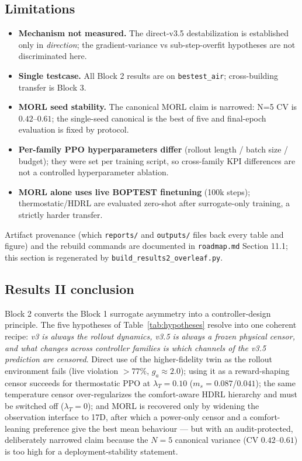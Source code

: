 \documentclass[11pt,a4paper]{article}
\begin{document}
\subsection{Limitations}

\begin{itemize}
  \item \textbf{Mechanism not measured.} The direct-v3.5 destabilization is established only in \emph{direction}; the gradient-variance vs sub-step-overfit hypotheses are not discriminated here.
  \item \textbf{Single testcase.} All Block 2 results are on \texttt{bestest\_air}; cross-building transfer is Block 3.
  \item \textbf{MORL seed stability.} The canonical MORL claim is narrowed: N=5 CV is $0.42$--$0.61$; the single-seed canonical is the best of five and final-epoch evaluation is fixed by protocol.
  \item \textbf{Per-family PPO hyperparameters differ} (rollout length / batch size / budget); they were set per training script, so cross-family KPI differences are not a controlled hyperparameter ablation.
  \item \textbf{MORL alone uses live BOPTEST finetuning} (100k steps); thermostatic/HDRL are evaluated zero-shot after surrogate-only training, a strictly harder transfer.
\end{itemize}

Artifact provenance (which \texttt{reports/} and \texttt{outputs/} files back every table and figure) and the rebuild commands are documented in \texttt{roadmap.md} Section 11.1; this section is regenerated by \texttt{build\_results2\_overleaf.py}.

\subsection{Results II conclusion}

Block 2 converts the Block 1 surrogate asymmetry into a controller-design principle. The five hypotheses of Table~\ref{tab:hypotheses} resolve into one coherent recipe: \emph{v3 is always the rollout dynamics, v3.5 is always a frozen physical censor, and what changes across controller families is which channels of the v3.5 prediction are censored}. Direct use of the higher-fidelity twin as the rollout environment fails (live violation $>77\%$, $g_a\approx2.0$); using it as a reward-shaping censor succeeds for thermostatic PPO at $\lambda_T=0.10$ ($m_s=0.087$/$0.041$); the same temperature censor over-regularizes the comfort-aware HDRL hierarchy and must be switched off ($\lambda_T=0$); and MORL is recovered only by widening the observation interface to 17D, after which a power-only censor and a comfort-leaning preference give the best mean behaviour --- but with an audit-protected, deliberately narrowed claim because the $N=5$ canonical variance (CV $0.42$--$0.61$) is too high for a deployment-stability statement.
\end{document}

